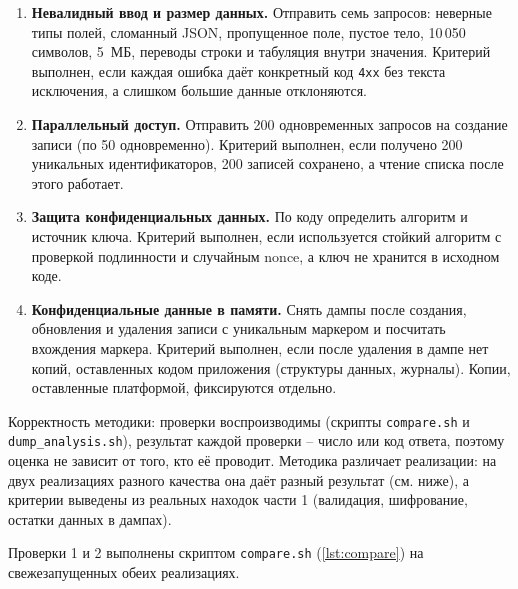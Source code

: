 \begin{enumerate}
  \item \textbf{Невалидный ввод и размер данных.} Отправить семь
  запросов: неверные типы полей, сломанный JSON, пропущенное поле, пустое
  тело, 10\,050 символов, 5~МБ, переводы строки и табуляция внутри
  значения. Критерий выполнен, если каждая ошибка даёт конкретный
  код \texttt{4xx} без текста исключения, а слишком большие данные
  отклоняются.
  \item \textbf{Параллельный доступ.} Отправить 200 одновременных
  запросов на создание записи (по 50 одновременно). Критерий выполнен,
  если получено 200 уникальных идентификаторов, 200 записей сохранено, а
  чтение списка после этого работает.
  \item \textbf{Защита конфиденциальных данных.} По коду определить
  алгоритм и источник ключа. Критерий выполнен, если используется
  стойкий алгоритм с проверкой подлинности и случайным nonce, а ключ
  не хранится в исходном коде.
  \item \textbf{Конфиденциальные данные в памяти.} Снять дампы после
  создания, обновления и удаления записи с уникальным маркером и
  посчитать вхождения маркера. Критерий выполнен, если после удаления
  в дампе нет копий, оставленных кодом приложения (структуры данных,
  журналы). Копии, оставленные платформой, фиксируются отдельно.
\end{enumerate}

Корректность методики: проверки воспроизводимы (скрипты
\texttt{compare.sh} и \texttt{dump\_analysis.sh}), результат каждой
проверки -- число или код ответа, поэтому оценка не зависит от того, кто
её проводит. Методика различает реализации: на двух реализациях разного
качества она даёт разный результат (см. ниже), а критерии выведены из
реальных находок части 1 (валидация, шифрование, остатки данных в дампах).


Проверки 1 и 2 выполнены скриптом \texttt{compare.sh}
(\autoref{lst:compare}) на свежезапущенных обеих реализациях.


